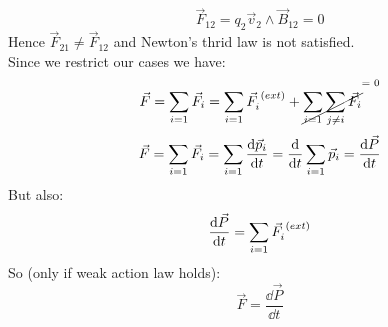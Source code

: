 \begin{equation}
    \vec{F}_{12} = q_2\vec{v}_2\wedge\vec{B}_{12} = 0
\end{equation}
Hence $\vec{F}_{21} \neq \vec{F}_{12}$ and Newton's thrid law is not satisfied.\\
Since we restrict our cases we have:
\begin{equation}
    \vec{F} = \bigsum_{i=1}\vec{F}_i = \bigsum_{i=1}\vec{F}_i^{\;(ext)} + \cancel{\bigsum_{i=1}\bigsum_{j\neq i}\vec{F}_i}\raisebox{14pt}{\scriptsize = 0}
\end{equation}
\begin{equation}
    \vec{F} = \displaystyle\sum_{i=1}\vec{F}_i = \displaystyle\sum_{i=1}\dfrac{\dd{\vec{p}_i}}{\dd{t}} = \dfrac{\dd{}}{\dd{t}}\displaystyle\sum_{i=1}\vec{p}_i = \dfrac{\dd{\vec{P}}}{\dd{t}}
\end{equation}
But also:
\begin{equation}
    \dfrac{\dd{\vec{P}}}{\dd{t}} = \displaystyle\sum_{i=1}\vec{F}_i^{\;(ext)}
\end{equation}
So (only if weak action law holds):
\begin{equation}
    \vec{F} = \dfrac{\dd{\vec{P}}}{\dd{t}}
\end{equation}
